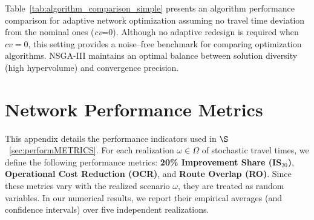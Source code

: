 \documentclass[a4paper,fleqn]{cas-sc}
\begin{document}
Table~\ref{tab:algorithm_comparison_simple} presents an algorithm performance comparison for adaptive network optimization assuming no travel time deviation from the nominal ones (\textit{cv}=0).
Although no adaptive redesign is required when $cv=0$, this setting provides a noise–free benchmark for comparing optimization algorithms.
NSGA-III maintains an optimal balance between solution diversity (high hypervolume) and convergence precision.
%


\section{Network Performance Metrics}\label{A.PerformanceMetrics}

This appendix details the performance indicators used in $\S$~\ref{sec:performMETRICS}.
For each realization $\omega \in \Omega$ of stochastic travel times, we define the following performance metrics: \textbf{20\% Improvement Share (IS$_{20}$)}, \textbf{Operational Cost Reduction (OCR)}, and \textbf{Route Overlap (RO)}. Since these metrics vary with the realized scenario $\omega$, they are treated as random variables. In our numerical results, we report their empirical averages (and confidence intervals) over five independent realizations.
\end{document}
